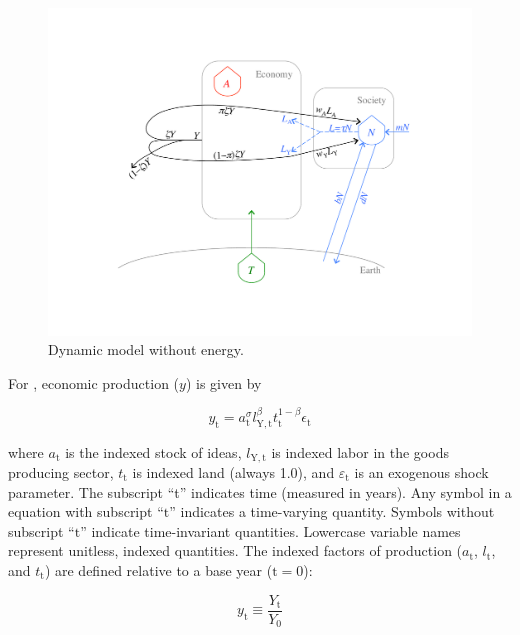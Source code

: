 \documentclass[letterpaper,12pt]{article}
\begin{document}
\begin{figure} \label{fig:ModelWithoutEnergy}
  \begin{center}
    \includegraphics[width=\textwidth]{figure_other/ModelWithoutEnergy.pdf}
    \caption{Dynamic model without energy.}
  \end{center}
\end{figure}

For \citet{Jones:2001wn}, economic production ($y$) is given by

\begin{equation} \label{eq:Jones_production_function}
	y_\mathrm{t} = a_\mathrm{t} ^\sigma l_\mathrm{Y,t} ^\beta t_\mathrm{t} ^{1-\beta} \epsilon_\mathrm{t}
\end{equation}

\noindent where $a_\mathrm{t}$ is the indexed stock of ideas, $l_\mathrm{Y,t}$ is indexed labor in the goods producing sector, $t_\mathrm{t}$ is indexed land (always 1.0), and $\varepsilon_\mathrm{t}$ is an exogenous shock parameter. The subscript ``t'' indicates time (measured in years). Any symbol in a equation with subscript ``$\mathrm{t}$'' indicates a time-varying quantity. Symbols without subscript ``$\mathrm{t}$'' indicate time-invariant quantities. Lowercase variable names represent unitless, indexed quantities. The indexed factors of production ($a_\mathrm{t}$, $l_\mathrm{t}$, and $t_\mathrm{t}$) are defined relative to a base year ($\mathrm{t} = 0$):

\begin{equation} \label{eq:index_y}
	y_\mathrm{t} \equiv \frac{Y_\mathrm{t}}{Y_\mathrm{0}}
\end{equation}
\end{document}

